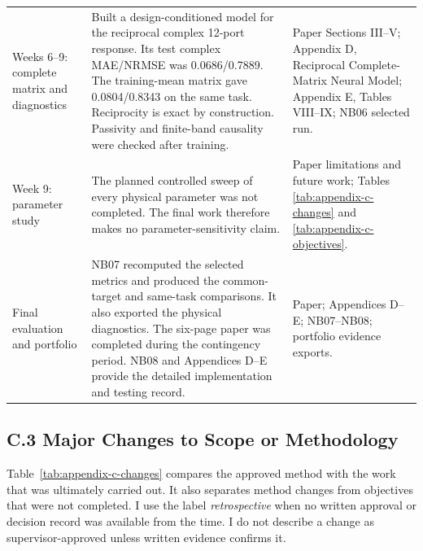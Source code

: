 \begin{table}[!htbp]
\begin{tabular}{@{}p{}p{}
                         p{}@{}}
        Weeks 6--9:
        complete matrix and diagnostics
          & Built a design-conditioned model for the reciprocal complex 12-port
            response. Its test complex MAE/NRMSE was 0.0686/0.7889. The
            training-mean matrix gave 0.0804/0.8343 on the same task.
            Reciprocity is exact by construction. Passivity and finite-band
            causality were checked after training.
          & Paper Sections III--V; Appendix D, Reciprocal Complete-Matrix
            Neural Model; Appendix E, Tables VIII--IX; NB06 selected run. \\
        Week 9:
        parameter study
          & The planned controlled sweep of every physical parameter was not
            completed. The final work therefore makes no parameter-sensitivity
            claim.
          & Paper limitations and future work; Tables
            \ref{tab:appendix-c-changes} and
            \ref{tab:appendix-c-objectives}. \\
        Final evaluation and
        portfolio
          & NB07 recomputed the selected metrics and produced the common-target
            and same-task comparisons. It also exported the physical
            diagnostics. The six-page paper was completed during the
            contingency period. NB08 and Appendices D--E provide the detailed
            implementation and testing record.
          & Paper; Appendices D--E; NB07--NB08; portfolio evidence exports. \\
        \bottomrule
    \end{tabular}
\end{table}

\clearpage
\PortfolioContentPageCommand
{}
{}
\subsection*{C.3 Major Changes to Scope or Methodology}
\label{app:c-changes}

Table~\ref{tab:appendix-c-changes} compares the approved method with the work
that was ultimately carried out. It also separates method changes from
objectives that were not completed. I use the label \emph{retrospective} when
no written approval or decision record was available from the time. I do not
describe a change as supervisor-approved unless written evidence confirms it.

